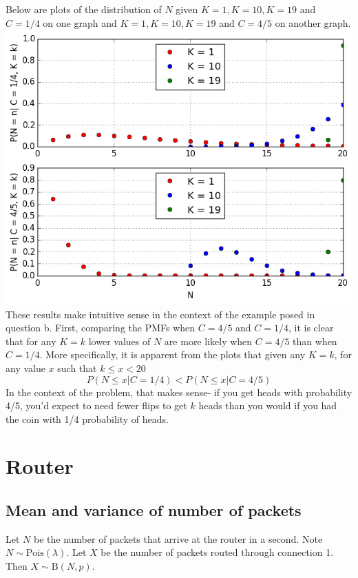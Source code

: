 \documentclass[paper=a4, fontsize=11pt]{scrartcl} %
\numberwithin{equation}{section} %
\numberwithin{figure}{section} %
\numberwithin{table}{section} %
\begin{document}
Below are plots of the distribution of $N$ given $K = 1, K = 10, K = 19$ and $C = 1/4$ on one graph and $K = 1, K = 10, K = 19$ and $C = 4/5$ on another graph.
\includegraphics[scale=0.83]{Q2d_fig}
These results make intuitive sense in the context of the example posed in question b. First, comparing the PMFs when $C = 4/5$ and $C = 1/4$, it is clear that for any $K = k$ lower values of $N$ are more likely when $C = 4/5$ than when $C = 1/4$. More specifically, it is apparent from the plots that given any $K = k$, for any value $x$ such that  $k \leq x < 20$
\[P(N \leq x | C = 1/4) < P(N \leq x | C = 4/5)\]
In the context of the problem, that makes sense- if you get heads with probability 4/5, you'd expect to need fewer flips to get $k$ heads than you would if you had the coin with 1/4 probability of heads.


\section{Router}

\subsection{Mean and variance of number of packets}

Let  $N$ be the number of packets that arrive at the router in a second. Note $N \sim \textrm{Pois}(\lambda)$.
Let $X$ be the number of packets routed through connection 1. Then $X \sim \textrm{B}(N,p)$.
 
\end{document}

